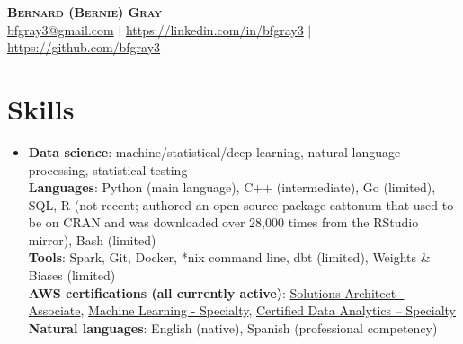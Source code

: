 \documentclass[letterpaper,11pt]{article}
\begin{document}
\begin{center}
    \textbf{\Huge \scshape Bernard (Bernie) Gray} \\ \vspace{1pt}
    \href{mailto:bfgray3@gmail.com}{bfgray3@gmail.com} $|$
    \url{https://linkedin.com/in/bfgray3} $|$
    \url{https://github.com/bfgray3}
\end{center}

\section{Skills}
\begin{itemize}[leftmargin=0.15in, label={}]
    \item{
     \textbf{Data science}{: machine/statistical/deep learning, natural language processing, statistical testing} \\
     \textbf{Languages}{: Python (main language), C++ (intermediate), Go (limited), SQL, R (not recent; authored an open source package cattonum that used to be on CRAN and was downloaded over 28,000 times from the RStudio mirror), Bash (limited)} \\
     \textbf{Tools}{: Spark, Git, Docker, *nix command line, dbt (limited), Weights \& Biases (limited)} \\
     \textbf{AWS certifications (all currently active)}{: \href{https://www.credly.com/badges/d15d58be-270e-4b5e-b9cf-301d16c45d74}{Solutions Architect - Associate}, \href{https://www.credly.com/badges/4adc2428-4a38-4f95-a473-7a1571da7b28}{Machine Learning - Specialty}, \href{https://www.credly.com/badges/23d07045-d56a-4626-99f8-f0815c7d0e6b}{Certified Data Analytics – Specialty}} \\
     \textbf{Natural languages}{: English (native), Spanish (professional competency)}
}
 \end{itemize}
\end{document}
